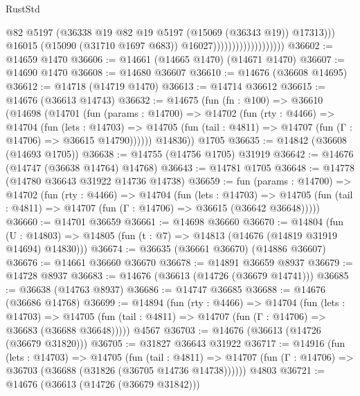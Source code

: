 \begin{lexlean}{RustStd}
\begin{coremodule}
                                              @82
                                              @5197
                                              (@36338
                                                @19
                                                @82
                                                @19
                                                @5197
                                                (@15069 (@36343 @19))
                                                @17313)))
                                          @16015
                                          (@15090 (@31710 @1697 @683))
                                          @16027)))))))))))))))))))
@36602 := @14659 @1470
@36606 := @14661 (@14665 @1470) (@14671 @1470)
@36607 := @14690 @1470
@36608 := @14680 @36607
@36610 := @14676 (@36608 @14695)
@36612 := @14718 (@14719 @1470)
@36613 := @14714 @36612
@36615 := @14676 (@36613 @14743)
@36632 := @14675
    (fun (fn : @100) =>
    @36610
      (@14698
        (@14701
          (fun (params : @14700) =>
          @14702
            (fun (rty : @4466) =>
            @14704
              (fun (lets : @14703) =>
              @14705 (fun (tail : @4811) => @14707 (fun (Γ : @14706) => @36615 @14790))))))
        @14836))
    @1705
@36635 := @14842 (@36608 (@14693 @1705))
@36638 := @14755 (@14756 @1705) @31919
@36642 := @14676 (@14747 (@36638 @14764) @14768)
@36643 := @14781 @1705
@36648 := @14778 (@14780 @36643 @31922 @14736 @14738)
@36659 := fun (params : @14700) =>
  @14702
    (fun (rty : @4466) =>
    @14704
      (fun (lets : @14703) =>
      @14705 (fun (tail : @4811) => @14707 (fun (Γ : @14706) => @36615 (@36642 @36648)))))
@36660 := @14701 @36659
@36661 := @14698 @36660
@36670 := @14804
    (fun (U : @14803) => @14805 (fun (t : @7) => @14813 (@14676 (@14819 @31919 @14694) @14830)))
@36674 := @36635 (@36661 @36670) (@14886 @36607)
@36676 := @14661 @36660 @36670
@36678 := @14891 @36659 @8937
@36679 := @14728 @8937
@36683 := @14676 (@36613 (@14726 (@36679 @14741)))
@36685 := @36638 (@14763 @8937)
@36686 := @14747 @36685
@36688 := @14676 (@36686 @14768)
@36699 := @14894
    (fun (rty : @4466) =>
    @14704
      (fun (lets : @14703) =>
      @14705 (fun (tail : @4811) => @14707 (fun (Γ : @14706) => @36683 (@36688 @36648)))))
    @4567
@36703 := @14676 (@36613 (@14726 (@36679 @31820)))
@36705 := @31827 @36643 @31922
@36717 := @14916
    (fun (lets : @14703) =>
    @14705
      (fun (tail : @4811) =>
      @14707 (fun (Γ : @14706) => @36703 (@36688 (@31826 (@36705 @14736 @14738))))))
    @4803
@36721 := @14676 (@36613 (@14726 (@36679 @31842)))

\end{coremodule}
\end{lexlean}
